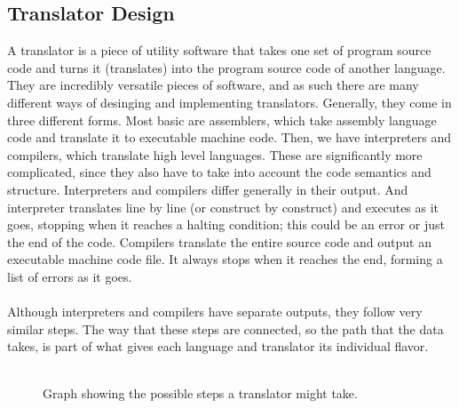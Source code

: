 \documentclass[a4paper, 12pt]{article}
\begin{document}
\subsection{Translator Design}\label{sec:translator-design}
A translator is a piece of utility software that takes one set of program source code and turns it (translates) into the program source code of another language. They are incredibly versatile pieces of software, and as such there are many different ways of desinging and implementing translators. Generally, they come in three different forms. Most basic are assemblers, which take assembly language code and translate it to executable machine code. Then, we have interpreters and compilers, which translate high level languages. These are significantly more complicated, since they also have to take into account the code semantics and structure. Interpreters and compilers differ generally in their output. And interpreter translates line by line (or construct by construct) and executes as it goes, stopping when it reaches a halting condition; this could be an error or just the end of the code. Compilers translate the entire source code and output an executable machine code file. It always stops when it reaches the end, forming a list of errors as it goes.\\
\\
Although interpreters and compilers have separate outputs, they follow very similar steps. The way that these steps are connected, so the path that the data takes, is part of what gives each language and translator its individual flavor.\\
\\
\begin{figure}[ht]
\centering
{}
\label{fig:translator-graph}
\caption{Graph showing the possible steps a translator might take.}
\end{figure}
\end{document}
